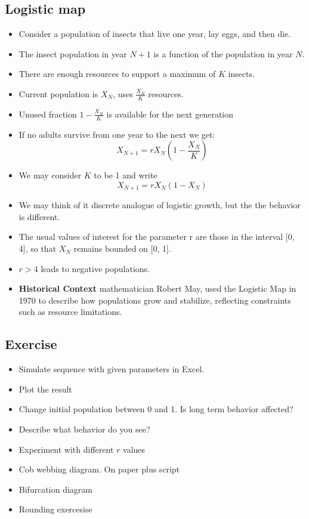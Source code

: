 \documentclass[12pt,a4paper]{article}
\begin{document}
\subsection{Logistic map}
\begin{itemize}
    \item Consider a population of insects that live one year, lay eggs, and then die. 
    \item The insect population in year $N + 1$ is a function of the population in year $N$. 
    \item There are enough resources to support a maximum of $K$ insects. 
    \item Current population is $X_N$, uses $\frac{X_N}{K}$ resources.
    \item Unused fraction $1 - \frac{X_N}{K}$ is available for the next generation
    \item If no adults survive from one year to the next we get:
   \[
    X_{N+1} = rX_N \left(1 - \frac{X_N}{K}\right)
  \]
  \item We may consider $K$ to be 1 and write
   \[
    X_{N+1} = rX_N \left(1 - {X_N}\right)
  \]
  \item We may think of it discrete analogue of logistic growth, but the the behavior is different. 
  \item The usual values of interest for the parameter r are those in the interval [0, 4], so that $X_N$ remains bounded on [0, 1]. 
  \item $r > 4$ leads to negative populations. 
  \item \textbf{Historical Context} mathematician Robert May,  used the Logistic Map in 1970 to describe how populations grow and stabilize, reflecting constraints such as resource limitations.
\end{itemize}

\subsection{Exercise}
    \begin{itemize}
        \item Simulate sequence with given parameters in Excel.
        \item Plot the result
        \item Change initial population between 0 and 1. Is long term behavior affected?
        \item Describe what behavior do you see?
        \item Experiment with different $r$ values
        \item Cob webbing diagram. On paper plus script
        \item Bifurcation diagram
        \item Rounding exercesise
    \end{itemize}
\end{document}
